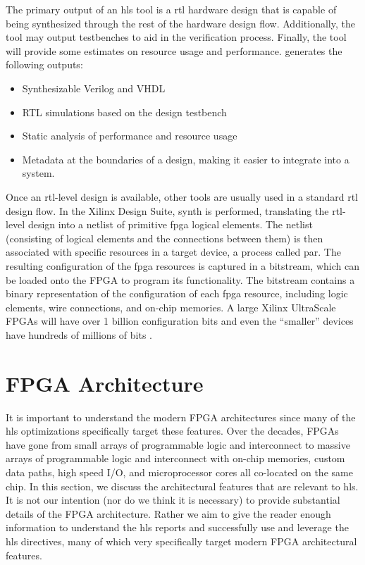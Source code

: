 The primary output of an \gls{hls} tool is a \gls{rtl} hardware design that is capable of being synthesized through the rest of the hardware design flow. Additionally, the tool may output testbenches to aid in the verification process. Finally, the tool will provide some estimates on resource usage and performance.  \VHLS generates the following outputs:
\begin{itemize}
\item Synthesizable Verilog and VHDL
\item RTL simulations based on the design testbench
\item Static analysis of performance and resource usage
\item Metadata at the boundaries of a design, making it easier to integrate into a system.
\end{itemize}

Once an \gls{rtl}-level design is available, other tools are usually used in a standard \gls{rtl} design flow.  In the Xilinx \vivado Design Suite, \gls{synth} is performed, translating the \gls{rtl}-level design into a \gls{netlist} of primitive \gls{fpga} logical elements.  The \gls{netlist} (consisting of logical elements and the connections between them) is then associated with specific resources in a target device, a process called \gls{par}.  The resulting configuration of the \gls{fpga} resources is captured in a \gls{bitstream}, which can be loaded onto the FPGA to program its functionality.  The \gls{bitstream} contains a binary representation of the configuration of each \gls{fpga} resource, including logic elements, wire connections, and on-chip memories. A large Xilinx UltraScale FPGAs will have over 1 billion configuration bits and even the ``smaller'' devices have hundreds of millions of bits \cite{ultrascaleArchConfig}. 


\section{FPGA Architecture}

It is important to understand the modern FPGA architectures since many of the \gls{hls} optimizations specifically target these features. Over the decades, FPGAs have gone from small arrays of programmable logic and interconnect to massive arrays of programmable logic and interconnect with on-chip memories, custom data paths, high speed I/O, and microprocessor cores all co-located on the same chip. In this section, we discuss the  architectural features that are relevant to \gls{hls}. It is not our intention (nor do we think it is necessary) to provide substantial details of the FPGA architecture. Rather we aim to give the reader enough information to understand the \gls{hls} reports and successfully use and leverage the \gls{hls} directives, many of which very specifically target modern FPGA architectural features.


